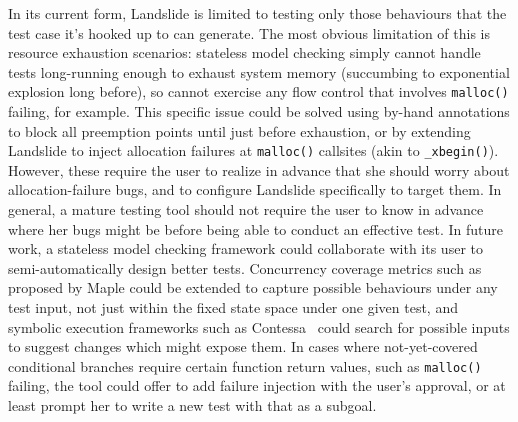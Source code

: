 In its current form, Landslide is limited to testing only those behaviours that the test case it's hooked up to can generate.
The most obvious limitation of this is resource exhaustion scenarios:
stateless model checking simply cannot handle tests long-running enough to exhaust system memory
(succumbing to exponential explosion long before),
so cannot exercise any flow control that involves {\tt malloc()} failing, for example.
This specific issue could be solved using by-hand annotations to block all preemption points until just before exhaustion,
or by extending Landslide to inject allocation failures at {\tt malloc()} callsites (akin to {\tt \_xbegin()}).
However,
these require the user to realize in advance that she should worry about allocation-failure bugs,
and to configure Landslide specifically to target them.
In general, a mature testing tool should not require the user to
know in advance where her bugs might be
before being able to conduct an effective test.
%
In future work, a stateless model checking framework could collaborate with its user to semi-automatically design better tests.
Concurrency coverage metrics such as proposed by Maple \cite{maple}
could be extended to capture possible behaviours under any test input,
not just within the fixed state space under one given test,
and symbolic execution frameworks such as Contessa~\cite{contessa}
could search for possible inputs to suggest changes which might expose them.
In cases where not-yet-covered conditional branches require
certain function return values,
such as {\tt malloc()} failing,
the tool could offer to add failure injection with the user's approval,
or at least prompt her to write a new test with that as a subgoal.

